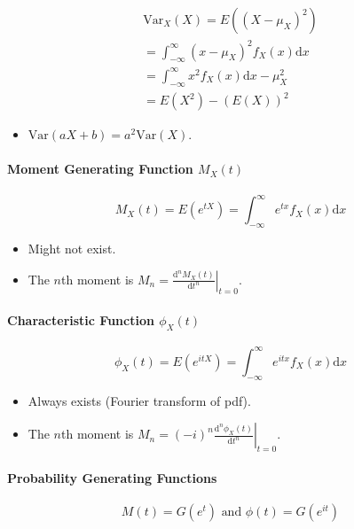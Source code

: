 \documentclass[twocolumn,english]{article}
\begin{document}
\begin{multline*}
\text{Var}_{X}\left(X\right)=E\left(\left(X-\mu_{X}\right)^{2}\right)\\
=\int_{-\infty}^{\infty}\left(x-\mu_{X}\right)^{2}f_{X}\left(x\right)\text{d}x\\
=\int_{-\infty}^{\infty}x^{2}f_{X}\left(x\right)\text{d}x-\mu_{X}^{2}\\
=E\left(X^{2}\right)-\left(E\left(X\right)\right)^{2}
\end{multline*}
\begin{itemize}
\item $\text{Var}\left(aX+b\right)=a^{2}\text{Var}\left(X\right)$.
\end{itemize}

\paragraph{Moment Generating Function $M_{X}\left(t\right)$}

\[
M_{X}\left(t\right)=E\left(e^{tX}\right)=\int_{-\infty}^{\infty}e^{tx}f_{X}\left(x\right)\text{d}x
\]
\begin{itemize}
\item Might not exist.
\item The $n$th moment is $\left.M_{n}=\frac{\text{d}^{n}M_{X}\left(t\right)}{\text{d}t^{n}}\right\vert _{t=0}$.
\end{itemize}

\paragraph{Characteristic Function $\phi_{X}\left(t\right)$}

\[
\phi_{X}\left(t\right)=E\left(e^{itX}\right)=\int_{-\infty}^{\infty}e^{itx}f_{X}\left(x\right)\text{d}x
\]
\begin{itemize}
\item Always exists (Fourier transform of pdf).
\item The $n$th moment is $\left.M_{n}=\left(-i\right)^{n}\frac{\text{d}^{n}\phi_{X}\left(t\right)}{\text{d}t^{n}}\right\vert _{t=0}$.
\end{itemize}

\paragraph{Probability Generating Functions}

\[
M\left(t\right)=G\left(e^{t}\right)\text{ and }\phi\left(t\right)=G\left(e^{it}\right)
\]
\end{document}
